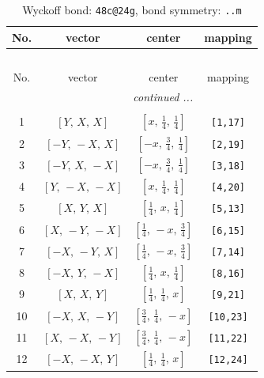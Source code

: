 \documentclass[fleqn,8pt]{jsarticle}
\begin{document}
\begin{longtable}{cccc}
\caption{Wyckoff bond: {\tt 48c@24g}, bond symmetry: {\tt ..m}}
 \\
 \hline \hline
No. & vector & center & mapping \\ \hline \endfirsthead

\multicolumn{3}{l}{\tablename\ \thetable{}} \\
 \hline \hline
No. & vector & center & mapping \\ \hline \endhead

 \hline \hline
\multicolumn{3}{r}{\footnotesize\it continued ...} \\ \endfoot

 \hline \hline
\multicolumn{3}{r}{} \\ \endlastfoot

1 & $\left[ Y,\, X,\, X \right]$ & $\left[ x,\, \frac{1}{4},\, \frac{1}{4} \right]$ & {\tt [1,17]} \\ \hline
2 & $\left[ - Y,\, - X,\, X \right]$ & $\left[ - x,\, \frac{3}{4},\, \frac{1}{4} \right]$ & {\tt [2,19]} \\ \hline
3 & $\left[ - Y,\, X,\, - X \right]$ & $\left[ - x,\, \frac{3}{4},\, \frac{1}{4} \right]$ & {\tt [3,18]} \\ \hline
4 & $\left[ Y,\, - X,\, - X \right]$ & $\left[ x,\, \frac{1}{4},\, \frac{1}{4} \right]$ & {\tt [4,20]} \\ \hline
5 & $\left[ X,\, Y,\, X \right]$ & $\left[ \frac{1}{4},\, x,\, \frac{1}{4} \right]$ & {\tt [5,13]} \\ \hline
6 & $\left[ X,\, - Y,\, - X \right]$ & $\left[ \frac{1}{4},\, - x,\, \frac{3}{4} \right]$ & {\tt [6,15]} \\ \hline
7 & $\left[ - X,\, - Y,\, X \right]$ & $\left[ \frac{1}{4},\, - x,\, \frac{3}{4} \right]$ & {\tt [7,14]} \\ \hline
8 & $\left[ - X,\, Y,\, - X \right]$ & $\left[ \frac{1}{4},\, x,\, \frac{1}{4} \right]$ & {\tt [8,16]} \\ \hline
9 & $\left[ X,\, X,\, Y \right]$ & $\left[ \frac{1}{4},\, \frac{1}{4},\, x \right]$ & {\tt [9,21]} \\ \hline
10 & $\left[ - X,\, X,\, - Y \right]$ & $\left[ \frac{3}{4},\, \frac{1}{4},\, - x \right]$ & {\tt [10,23]} \\ \hline
11 & $\left[ X,\, - X,\, - Y \right]$ & $\left[ \frac{3}{4},\, \frac{1}{4},\, - x \right]$ & {\tt [11,22]} \\ \hline
12 & $\left[ - X,\, - X,\, Y \right]$ & $\left[ \frac{1}{4},\, \frac{1}{4},\, x \right]$ & {\tt [12,24]} \\
\end{longtable}
\end{document}
